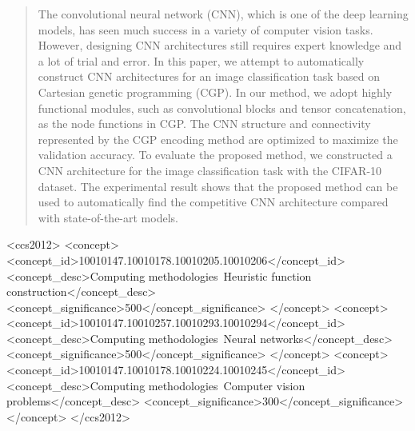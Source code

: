 \documentclass[sigconf]{acmart}
\newcommand{\markupdraft}[2]{%
    \ifthenelse{\equal{#1}{display}}{#2}{}%
    \ifthenelse{\equal{#1}{color}}{\color{#2}}{}%
}
\newcommand{\newcolored}[3][]{{\markupdraft{color}{#2}#3}%
    \ifthenelse{\equal{#1}{}}{}{\markupdraft{display}{{\color{yellow!70!black}[#1]}}}}
\newcommand{\new}[2][]{\newcolored[#1]{blue}{#2}}%
\renewcommand{\markupdraft}[2]{}
\begin{document}
\begin{abstract}
The convolutional neural network (CNN), which is one of the deep learning models, has seen much success in a variety of computer vision tasks. However, designing CNN architectures still requires expert knowledge and \new{a lot of trial and error.} In this paper, we attempt to automatically construct \new{CNN} architectures for an image classification task based on Cartesian genetic programming (CGP). In our method, we adopt \new{highly functional} modules\new{,} such as convolutional blocks and tensor concatenation\new{,} as the node functions in CGP. The CNN structure and connectivity represented by the CGP encoding method are optimized to maximize the validation accuracy. To evaluate the proposed method, we constructed \new{a} CNN architecture for the image classification task with the CIFAR-10 dataset. The experimental result shows that the proposed method can \new{be used to} automatically find the competitive CNN architecture compared with state-of-the-art models.
\end{abstract}

%
%
\begin{CCSXML}
<ccs2012>
<concept>
<concept_id>10010147.10010178.10010205.10010206</concept_id>
<concept_desc>Computing methodologies~Heuristic function construction</concept_desc>
<concept_significance>500</concept_significance>
</concept>
<concept>
<concept_id>10010147.10010257.10010293.10010294</concept_id>
<concept_desc>Computing methodologies~Neural networks</concept_desc>
<concept_significance>500</concept_significance>
</concept>
<concept>
<concept_id>10010147.10010178.10010224.10010245</concept_id>
<concept_desc>Computing methodologies~Computer vision problems</concept_desc>
<concept_significance>300</concept_significance>
</concept>
</ccs2012>
\end{CCSXML}
\end{document}
